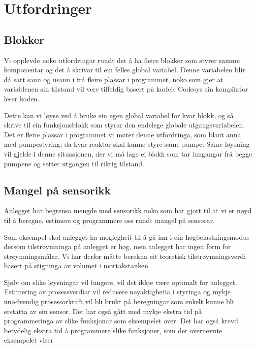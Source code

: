 \section{Utfordringer}
\thispagestyle{fancy}

\subsection{Blokker}
Vi opplevde noko utfordringar rundt det å ha fleire blokker som styrer samme komponentar og det å  
skrivar til ein felles global variabel.
Denne variabelen blir då satt sann og usann i frå fleire plassar i programmet, noko som gjer at 
variablenen sin tilstand vil vere tilfeldig basert på korleis Codesys sin kompilator leser koden.

Dette kan vi løyse ved å bruke ein egen global variabel for kvar blokk, 
og så skrive til ein funksjonsblokk som styrar den endelege globale utgangsvariabelen.
Det er fleire plassar i programmet vi møter denne utfordringa, som blant anna med pumpestyring, 
da kvar reaktor skal kunne styre same pumpe. Same løysning vil gjelde i denne situasjonen, 
der vi må lage ei blokk som tar inngangar frå begge pumpene og setter utgangen til riktig tilstand.  

\subsection{Mangel på sensorikk}

Anlegget har begrensa mengde med sensorikk noko som har gjort til at vi er nøyd til å
beregne, estimere og programmere oss rundt mangel på sensorar.

Som eksempel skal anlegget ha moglegheit til å gå inn i ein
høgbelastningsmodus dersom tilstrøymninga på anlegget er høg, 
men anlegget har ingen form for strøymningsmålar. \newline
Vi har derfor måtte berekna eit teoretisk tilstrøymningsverdi basert på stigninga
av volumet i mottakstanken.

Sjølv om slike løysningar vil fungere, vil det ikkje være optimalt for anlegget.
Estimering av prosessverdiar vil redusere nøyaktigheita i styringa og
mykje unødvendig prosessorkraft vil bli brukt på beregningar som enkelt kunne bli
erstatta av ein sensor. Det har også gått med mykje ekstra tid på programmeringa 
av slike funksjonar som eksempelet over.
Det har også krevd betydelig ekstra tid å programmere slike funksjoner, 
som det overnevnte eksempelet viser




